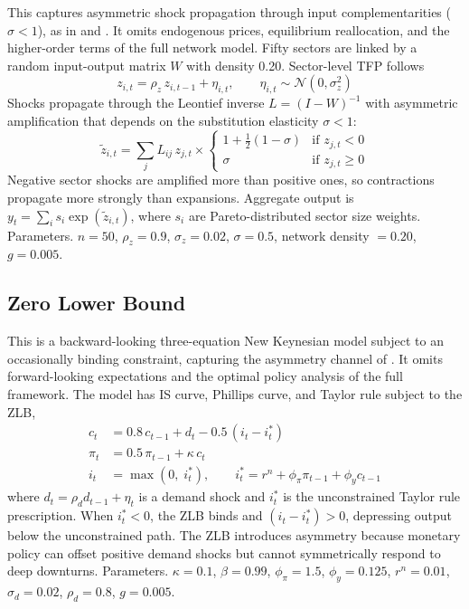 \documentclass[10pt]{article}
\begin{document}
This captures asymmetric shock propagation through input complementarities ($\sigma < 1$), as in \citet{acemoglu_etal2012} and \citet{baqaee_farhi2019}. It omits endogenous prices, equilibrium reallocation, and the higher-order terms of the full network model. Fifty sectors are linked by a random input-output matrix $W$ with density 0.20. Sector-level TFP follows
\begin{equation}
z_{i,t} = \rho_z \, z_{i,t-1} + \eta_{i,t}, \qquad \eta_{i,t} \sim \mathcal{N}(0, \sigma_z^2)
\end{equation}
Shocks propagate through the Leontief inverse $L = (I - W)^{-1}$ with asymmetric amplification that depends on the substitution elasticity $\sigma < 1$:
\begin{equation}
\tilde{z}_{i,t} = \sum_j L_{ij} \, z_{j,t} \times \begin{cases} 1 + \tfrac{1}{2}(1 - \sigma) & \text{if } z_{j,t} < 0 \\ \sigma & \text{if } z_{j,t} \geq 0 \end{cases}
\end{equation}
Negative sector shocks are amplified more than positive ones, so contractions propagate more strongly than expansions. Aggregate output is $y_t = \sum_i s_i \exp(\tilde{z}_{i,t})$, where $s_i$ are Pareto-distributed sector size weights. Parameters. $n = 50$, $\rho_z = 0.9$, $\sigma_z = 0.02$, $\sigma = 0.5$, network density $= 0.20$, $g = 0.005$.

\subsection*{Zero Lower Bound}

This is a backward-looking three-equation New Keynesian model subject to an occasionally binding constraint, capturing the asymmetry channel of \citet{eggertsson_woodford2003}. It omits forward-looking expectations and the optimal policy analysis of the full framework. The model has IS curve, Phillips curve, and Taylor rule subject to the ZLB,
\begin{align}
c_t &= 0.8 \, c_{t-1} + d_t - 0.5 \, (i_t - i^*_t) \\
\pi_t &= 0.5 \, \pi_{t-1} + \kappa \, c_t \\
i_t &= \max\!\left(0,\; i^*_t\right), \qquad i^*_t = r^n + \phi_\pi \pi_{t-1} + \phi_y c_{t-1}
\end{align}
where $d_t = \rho_d d_{t-1} + \eta_t$ is a demand shock and $i^*_t$ is the unconstrained Taylor rule prescription. When $i^*_t < 0$, the ZLB binds and $(i_t - i^*_t) > 0$, depressing output below the unconstrained path. The ZLB introduces asymmetry because monetary policy can offset positive demand shocks but cannot symmetrically respond to deep downturns. Parameters. $\kappa = 0.1$, $\beta = 0.99$, $\phi_\pi = 1.5$, $\phi_y = 0.125$, $r^n = 0.01$, $\sigma_d = 0.02$, $\rho_d = 0.8$, $g = 0.005$.
\end{document}
